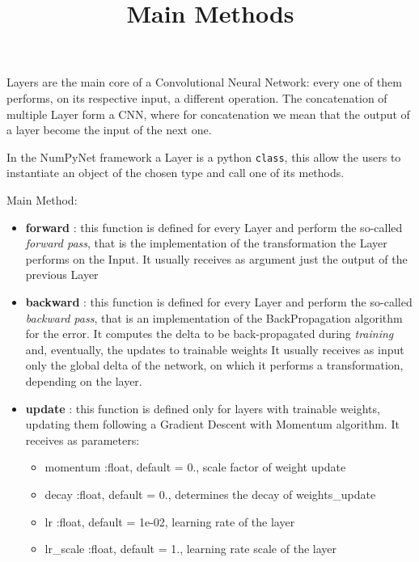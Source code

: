 
Layers are the main core of a Convolutional Neural Network: every one of them performs, on its respective input, a different operation.
The concatenation of multiple Layer form a CNN, where for concatenation we mean that the output of a layer become the input of the next one.

In the NumPyNet framework a Layer is a python \lstinline{class}, this allow the users to instantiate an object of the chosen type and call one of its methods.

Main Method:
\begin{itemize}
 \title{Main Methods}
 \item \textbf{forward}  : this function is defined for every Layer and perform the so-called \textit{forward pass}, that is the implementation of the transformation the Layer performs on the Input.
    It usually receives as argument just the output of the previous Layer
 \item \textbf{backward} : this function is defined for every Layer and perform the so-called \textit{backward pass}, that is an implementation of the BackPropagation algorithm for the error.
    It computes the delta to be back-propagated during \textit{training} and, eventually, the updates to trainable weights
    It usually receives as input only the global delta of the network, on which it performs a transformation, depending on the layer.
 \item \textbf{update}   : this function is defined only for layers with trainable weights, updating them following a Gradient Descent with Momentum algorithm.
    It receives as parameters:
    \begin{itemize}
     \item momentum  :float, default = 0., scale factor of weight update
     \item decay     :float, default = 0., determines the decay of weights\_update
     \item lr        :float, default = 1e-02, learning rate of the layer
     \item lr\_scale :float, default = 1., learning rate scale of the layer
    \end{itemize}
\end{itemize}



 
 
